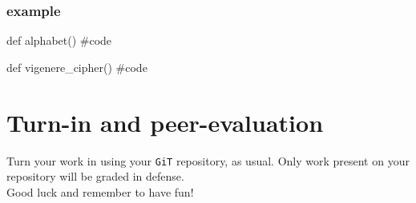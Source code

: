 \documentclass{42-en}
\begin{document}
    \subsection{example}

           \begin{42ccode}
                def alphabet()
                    #code

                def vigenere_cipher()
                    #code
    
            \end{42ccode}
            

\chapter{Turn-in and peer-evaluation}

    Turn your work in using your \texttt{GiT} repository, as
    usual. Only work present on your repository will be graded in defense.\\

    Good luck and remember to have fun!



\end{document}
